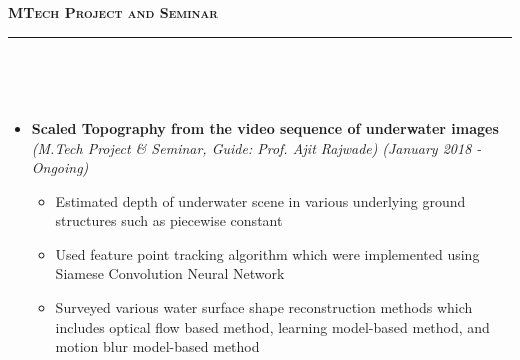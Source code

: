 \documentclass[a4paper,10pt]{article}
\newcommand{\isep}{-2 pt}
\newcommand{\lsep}{-0.5cm}
\newcommand{\resheading}[1]{{\small
        {
            \begin{minipage}
                {0.992\textwidth}\textbf{{\textsc{#1 \vphantom{p\^{E}} }}}
                \\[-0.3cm]
                \hrule
            \end{minipage}
            \\[-0.5cm]
        }
 }}
\begin{document}
\hspace{0.2cm}\\
\hspace{0.2cm}\\
\hspace{0.2cm}\\
\hspace{0.2cm}\\
\hspace{0.2cm}\\
\hspace{0.2cm}\\
\hspace{0.2cm}\\
\hspace{0.2cm}\\
\hspace{0.2cm}\\
\hspace{0.2cm}\\
\hspace{0.2cm}\\
\hspace{0.2cm}\\
\resheading{\textbf{\large MTech Project and Seminar}}\\[-0.4cm] 
\begin{itemize}
\item \textbf{Scaled Topography from the video sequence of underwater images}  \\
    \emph{(M.Tech Project \& Seminar, Guide: Prof. Ajit Rajwade)} \hfill {\emph{(January 2018 - Ongoing)}}
    \\ [-0.6cm]
      \begin{itemize}\itemsep \isep
        \item Estimated depth of underwater scene in various underlying ground structures such as piecewise constant
        \item Used feature point tracking algorithm which were implemented using Siamese Convolution Neural Network
        \item Surveyed various water surface shape reconstruction methods which includes optical flow based method, learning model-based method, and motion blur model-based method
    \\ [-0.6cm]
      \end{itemize}
\end{itemize}
\end{document}
